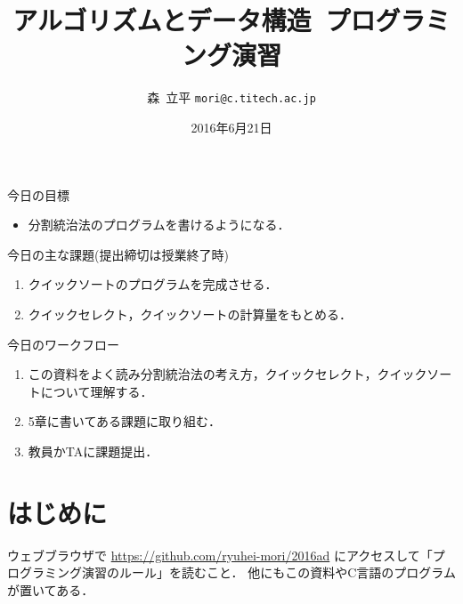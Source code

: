 \documentclass[a4paper,twoside,onecolumn,openany,article]{memoir}
\title{アルゴリズムとデータ構造~プログラミング演習}
\date{2016年6月21日}
\author{森~立平 \texttt{mori@c.titech.ac.jp}}
\theoremstyle{remark}
\begin{document}
\maketitle

\noindent
今日の目標
\begin{itemize}
\item 分割統治法のプログラムを書けるようになる．
\end{itemize}

\noindent
今日の主な課題(提出締切は授業終了時)
\begin{enumerate}
\item クイックソートのプログラムを完成させる．
\item クイックセレクト，クイックソートの計算量をもとめる．
\end{enumerate}

\noindent
今日のワークフロー
\begin{enumerate}
\item この資料をよく読み分割統治法の考え方，クイックセレクト，クイックソートについて理解する．
\item 5章に書いてある課題に取り組む．
\item 教員かTAに課題提出．
\end{enumerate}

\section{はじめに}
ウェブブラウザで \url{https://github.com/ryuhei-mori/2016ad} にアクセスして「プログラミング演習のルール」を読むこと．
他にもこの資料やC言語のプログラムが置いてある．
\end{document}
